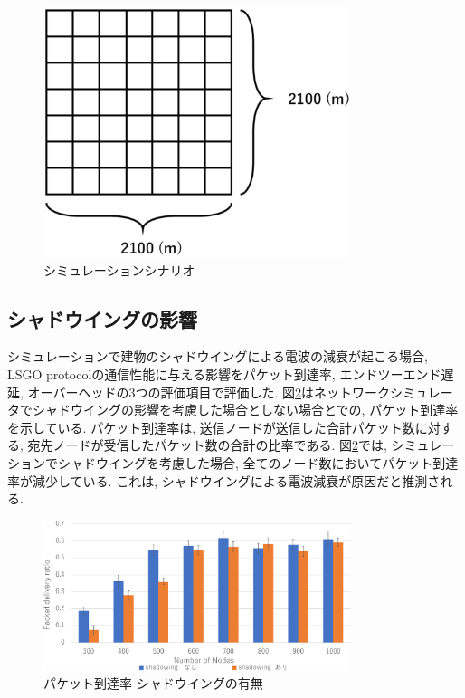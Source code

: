 \documentclass[technicalreport]{ieicej}
\begin{document}
\begin{figure}[!ht]
\centering
\includegraphics[width=90mm]{figures/scenario.eps}
\caption{シミュレーションシナリオ}
\label{fig:scenario}
\end{figure}

\par

\subsection{シャドウイングの影響}
シミュレーションで建物のシャドウイングによる電波の減衰が起こる場合,  LSGO protocolの通信性能に与える影響をパケット到達率, エンドツーエンド遅延, オーバーヘッドの3つの評価項目で評価した. 
図\ref{fig:PDR-shadowing}はネットワークシミュレータでシャドウイングの影響を考慮した場合としない場合とでの, パケット到達率を示している. パケット到達率は, 送信ノードが送信した合計パケット数に対する, 宛先ノードが受信したパケット数の合計の比率である. 図\ref{fig:PDR-shadowing}では, シミュレーションでシャドウイングを考慮した場合, 全てのノード数においてパケット到達率が減少している. これは, シャドウイングによる電波減衰が原因だと推測される.

\begin{figure}[!ht]
\centering
\includegraphics[width=90mm]{figures/PDR-shadowing.eps}
\caption{パケット到達率 シャドウイングの有無}
\label{fig:PDR-shadowing}
\end{figure}
\end{document}
